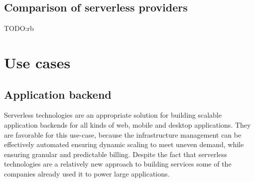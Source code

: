 \subsection{Comparison of serverless providers}

TODO:rb



\section{Use cases}



\subsection*{Application backend}


Serverless technologies are an appropriate solution for building scalable application backends for all kinds of web, mobile and desktop applications. They are favorable for this use-case, because the infrastructure management can be effectively automated ensuring dynamic scaling to meet uneven demand, while ensuring granular and predictable billing. Despite the fact that serverless technologies are a relatively new approach to building services some of the companies already used it to power large applications.

